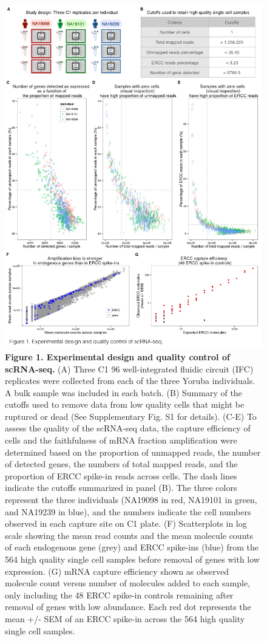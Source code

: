 \begin{figure}[htbp]
\centering
\includegraphics[width=5in]{img/ch04/Figure01.jpeg}
\caption{\textbf{Figure 1. Experimental design and quality control of
scRNA-seq.} (A) Three C1 96 well-integrated fluidic circuit (IFC)
replicates were collected from each of the three Yoruba individuals. A
bulk sample was included in each batch. (B) Summary of the cutoffs used
to remove data from low quality cells that might be ruptured or dead
(See Supplementary Fig. S1 for details). (C-E) To assess the quality of
the scRNA-seq data, the capture efficiency of cells and the faithfulness
of mRNA fraction amplification were determined based on the proportion
of unmapped reads, the number of detected genes, the numbers of total
mapped reads, and the proportion of ERCC spike-in reads across cells.
The dash lines indicate the cutoffs summarized in panel (B). The three
colors represent the three individuals (NA19098 in red, NA19101 in
green, and NA19239 in blue), and the numbers indicate the cell numbers
observed in each capture site on C1 plate. (F) Scatterplots in log scale
showing the mean read counts and the mean molecule counts of each
endogenous gene (grey) and ERCC spike-ins (blue) from the 564 high
quality single cell samples before removal of genes with low expression.
(G) mRNA capture efficiency shown as observed molecule count versus
number of molecules added to each sample, only including the 48 ERCC
spike-in controls remaining after removal of genes with low abundance.
Each red dot represents the mean +/- SEM of an ERCC spike-in across the
564 high quality single cell samples.}
\end{figure}

